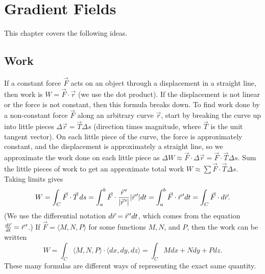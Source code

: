
\chapter{Gradient Fields}

This chapter covers the following ideas. 


\section{Work}

If a constant force $\vec F$ acts on an object through a displacement
in a straight line, then work is {$ W= \vec F\cdot \vec r $} (we use the
dot product).  If the displacement is not linear or the force is not
constant, then this formula breaks down. To find work done by a
non-constant force $\vec F$ along an arbitrary curve $\vec r$, start
by breaking the curve up into little pieces $\Delta \vec r = \vec T \Delta s$
(direction times magnitude, where $\vec T$ is the unit tangent
vector). On each little piece of the curve, the force is approximately
constant, and the displacement is approximately a straight line, so we
approximate the work done on each little piece as {$ \Delta W \approx \vec F \cdot \Delta
\vec r = \vec F \cdot \vec T \Delta s $}.  Sum the little pieces of work to get an
approximate total work {$ W \approx \sum \vec F \cdot \vec T \Delta s $}.  Taking limits
gives 
$$%
W = \int_C \vec F\cdot \vec T \,ds 
= \int_a^b\vec F\cdot \frac{\vec r\vp}{|\vec r\vp|}|\vec r\vp| dt 
= \int_a^b\vec F\cdot \vec r\vp dt 
= \int_C \vec F\cdot d\vec r.$$
(We use the differential notation {$ d\vec r= \vec r^{\,\prime} dt $}, which
comes from the equation {$ \frac{d\vec r}{dt} = \vec r^{\,\prime} $}.)
If {$ \vec F = \langle M,N,P\rangle $} for some functions $M,N$, and
$P$, then the work can be written 
$$W = \int_C \langle M,N,P\rangle\cdot\langle dx,dy,dz\rangle 
= \int_C Mdx+Ndy+Pdz.$$ These many formulas are different ways of
representing the exact same quantity.

